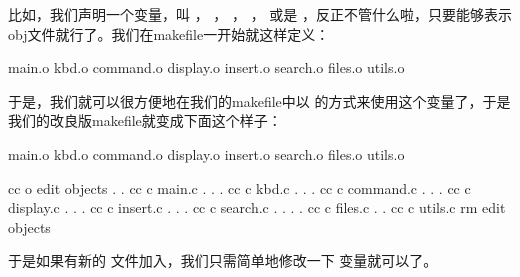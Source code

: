 \documentclass[a4paper,10pt]{sphinxmanual}
\begin{document}
比如，我们声明一个变量，叫  ，  ，  ，  ，
 或是  ，反正不管什么啦，只要能够表示obj文件就行了。我们在makefile一开始就这样定义：

\begin{sphinxVerbatim}[commandchars=\\\{\}]
  main.o kbd.o command.o display.o 
     insert.o search.o files.o utils.o
\end{sphinxVerbatim}

于是，我们就可以很方便地在我们的makefile中以  的方式来使用这个变量了，于是我们的改良版makefile就变成下面这个样子：

\begin{sphinxVerbatim}[commandchars=\\\{\}]
  main.o kbd.o command.o display.o 
    insert.o search.o files.o utils.o

 
    cc \PYGZhy{}o edit objects
 . .
    cc \PYGZhy{}c main.c
 . . .
    cc \PYGZhy{}c kbd.c
 . . .
    cc \PYGZhy{}c command.c
 . . .
    cc \PYGZhy{}c display.c
 . . .
    cc \PYGZhy{}c insert.c
 . . .
    cc \PYGZhy{}c search.c
 . . . .
    cc \PYGZhy{}c files.c
 . .
    cc \PYGZhy{}c utils.c
    rm edit objects
\end{sphinxVerbatim}

于是如果有新的  文件加入，我们只需简单地修改一下  变量就可以了。
\end{document}

